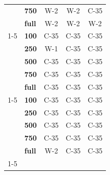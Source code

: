 \begin{table}[t]
\begin{tabular}{llccc}
\textbf{} & \textbf{750} & W-2 & W-2 & C-35 \\
\textbf{} & \textbf{full} & W-2 & W-2 & W-2 \\
\cline{1-5}
\multirow[t]{5}{*}{\textbf{Kiswahili}} & \textbf{100} & C-35 & C-35 & C-35 \\
\textbf{} & \textbf{250} & W-1 & C-35 & C-35 \\
\textbf{} & \textbf{500} & C-35 & C-35 & C-35 \\
\textbf{} & \textbf{750} & C-35 & C-35 & C-35 \\
\textbf{} & \textbf{full} & C-35 & C-35 & C-35 \\
\cline{1-5}
\multirow[t]{5}{*}{\textbf{Yoruba}} & \textbf{100} & C-35 & C-35 & C-35 \\
\textbf{} & \textbf{250} & C-35 & C-35 & C-35 \\
\textbf{} & \textbf{500} & C-35 & C-35 & C-35 \\
\textbf{} & \textbf{750} & C-35 & C-35 & C-35 \\
\textbf{} & \textbf{full} & W-2 & C-35 & C-35 \\
\cline{1-5}
\bottomrule
\end{tabular}
\end{table}
